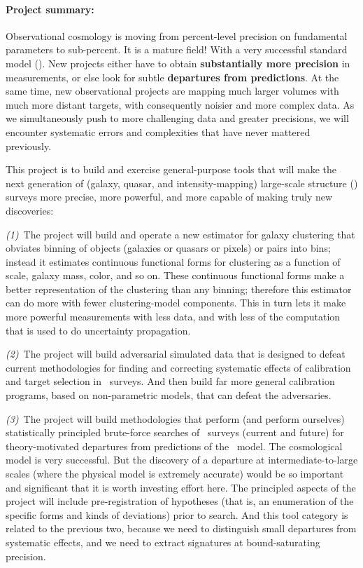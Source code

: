 \documentclass[12pt, fullpage, letterpaper]{article}
\newcommand{\LCDM}{\acronym{LCDM}}
\begin{document}
\paragraph{Project summary:}
Observational cosmology is moving from percent-level precision on
fundamental parameters to sub-percent.
It is a mature field! With a very successful standard model
(\LCDM).
New projects either have to obtain \textbf{substantially more
  precision} in measurements, or else look for subtle
\textbf{departures from predictions}.
At the same time, new observational projects are mapping much larger
volumes with much more distant targets, with consequently noisier and
more complex data.
As we simultaneously push to more challenging data and greater
precisions, we will encounter systematic errors and complexities that
have never mattered previously.

This project is to build and exercise general-purpose tools that will
make the next generation of (galaxy, quasar, and intensity-mapping)
large-scale structure (\LSS) surveys more precise, more powerful, and
more capable of making truly new discoveries:

\textsl{(1)}~The project will build and operate a new estimator for
galaxy clustering that obviates binning of objects (galaxies or
quasars or pixels) or pairs into bins; instead it estimates continuous
functional forms for clustering as a function of scale, galaxy mass,
color, and so on.
These continuous functional forms make a better representation of the
clustering than any binning; therefore this estimator can do more with
fewer clustering-model components.
This in turn lets it make more powerful measurements with less data,
and with less of the computation that is used to do uncertainty
propagation.

\textsl{(2)}~The project will build adversarial simulated data that is
designed to defeat current methodologies for finding and correcting
systematic effects of calibration and target selection in \LSS\ 
surveys. And then build far more general calibration
programs, based on non-parametric models, that can defeat the
adversaries.

\textsl{(3)}~The project will build methodologies that perform (and perform
ourselves) statistically principled brute-force searches of \LSS\ 
surveys (current and future) for theory-motivated departures from
predictions of the \LCDM\ model.
The cosmological model is very successful.
But the discovery of a departure at intermediate-to-large scales
(where the physical model is extremely accurate) would be so important
and significant that it is worth investing effort here.
The principled aspects of the project will include pre-registration of
hypotheses (that is, an enumeration of the specific forms and kinds of
deviations) prior to search.
And this tool category is related to the previous two, because we need
to distinguish small departures from systematic effects, and we need
to extract signatures at bound-saturating precision.
\end{document}
